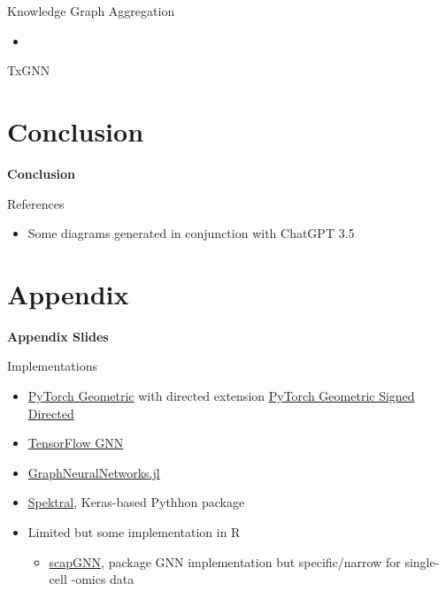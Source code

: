 \documentclass{beamer}
\begin{document}
\begin{frame}{Knowledge Graph Aggregation}
    \begin{itemize}
        \item 
    \end{itemize}
\end{frame}

\begin{frame}{TxGNN}
\end{frame}

\section*{Conclusion}

\begin{frame}{}
    \bf{\LARGE Conclusion}    
\end{frame}



\begin{frame}[allowframebreaks]{References}
    \begin{itemize}
    \item Some diagrams generated in conjunction with ChatGPT 3.5
    \end{itemize}
    \printbibliography 
\end{frame}



\section*{Appendix}

\begin{frame}{}
\bf{\LARGE Appendix Slides}    
\end{frame}

\begin{frame}{Implementations}
    \begin{itemize}
        \item \href{https://pytorch-geometric.readthedocs.io/en/latest/}{PyTorch Geometric} with directed extension \href{https://github.com/SherylHYX/pytorch_geometric_signed_directed}{PyTorch Geometric Signed Directed}
        \item \href{https://github.com/tensorflow/gnn}{TensorFlow GNN} \cite{ferludin_tf-gnn_2023}
        \item \href{https://carlolucibello.github.io/GraphNeuralNetworks.jl/dev/}{GraphNeuralNetworks.jl}
        \item \href{https://graphneural.network/}{Spektral}, Keras-based Pythhon package 
        \item Limited but some implementation in R 
        \begin{itemize}
            \item \href{https://cran.r-project.org/web/packages/scapGNN/vignettes/vignette.html}{scapGNN}, package GNN implementation but specific/narrow for single-cell -omics data 
        \end{itemize}
    \end{itemize}
\end{frame}
\end{document}
